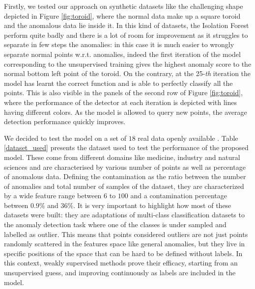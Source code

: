 
Firstly, we tested our approach on synthetic datasets like the challenging shape depicted in Figure \ref{fig:toroid}, where the normal data make up a square toroid and the anomalous data lie inside it. In this kind of datasets, the Isolation Forest perform quite badly and there is a lot of room for improvement as it struggles to  separate in few steps the anomalies: in this case it is much easier to wrongly separate normal points w.r.t. anomalies, indeed the first iteration of the model corresponding to the unsupervised training gives the highest anomaly score to the normal bottom left point of the toroid. On the contrary, at the 25-\textit{th} iteration the model has learnt the correct function and is able to perfectly classify all the points. This is also visible in the panels of the second row of Figure \ref{fig:toroid}, where the performance of the detector at each iteration is depicted with lines having different colors. As the model is allowed to query new points, the average detection performance quickly improves.

We decided to test the model on a set of $18$ real data openly available \cite{Rayana,Dua:2019}.
Table \ref{dataset_used} presents the dataset used to test the performance of the proposed model. These come from different domains like medicine, industry and natural sciences and are characterised by various number of points as well as percentage of anomalous data. Defining the contamination as the ratio between the number of anomalies and total number of samples of the dataset, they are characterized by a wide feature range between $6$ to $100$ and a contamination percentage between $0.9\%$ and $36\%$. It is very important to highlight how most of these datasets were built: they are adaptations of multi-class classification datasets to the anomaly detection task where one of the classes is under sampled and labelled as outlier. This means that points considered outliers are not just points randomly scattered in the features space like general anomalies, but they live in specific positions of the space that can be hard to be defined without labels. In this context, weakly supervised methods prove their efficacy, starting from an unsupervised guess, and improving continuously as labels are included in the model.

